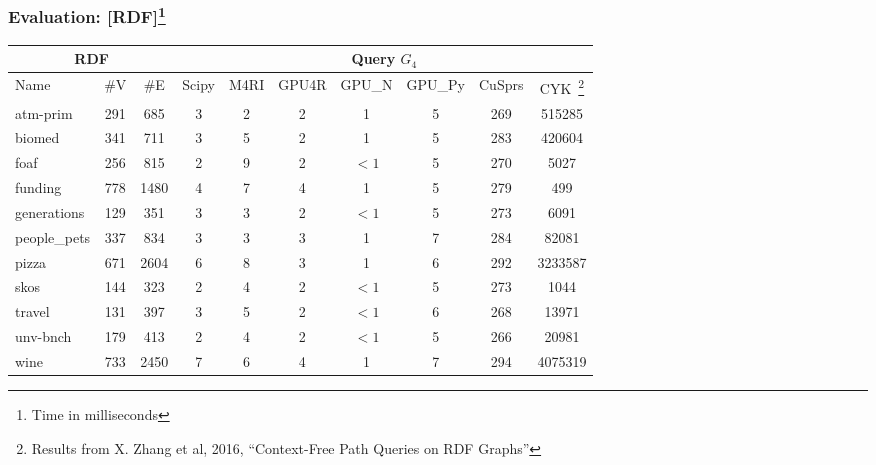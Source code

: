 \documentclass[xcolor=table]{beamer}
\newcommand{\ltz}{$< 1$}
\begin{document}
\begin{frame}[fragile] \frametitle{Evaluation: [RDF]\footnote{Time in milliseconds}}
\begin{center}
  {\tiny
  \begin{tabular}{| p{1.25cm} | c | c | c | c | c | c | c | c | c |}
      \hline
      \multicolumn{3}{|c|}{RDF}        & \multicolumn{7}{|c|}{Query $G_4$}  \\
      \hline
      Name                                & \#V & \#E  & Scipy & M4RI  & GPU4R & GPU\_N & GPU\_Py & CuSprs & CYK~\footnote{Results from X. Zhang et al, 2016, ``Context-Free Path Queries on RDF Graphs''} \\
      \hline
      \hline
      \tiny{atm-prim}                    & 291 & 685  & 3     &  2    & 2     & 1      & 5       & 269  & 515285  \\
      \tiny{biomed}                      & 341 & 711  & 3     &  5    & 2     & 1      & 5       & 283  & 420604  \\
      \tiny{foaf}                        & 256 & 815  & 2     &  9    & 2     & \ltz   & 5       & 270  & 5027    \\
      \tiny{funding}                     & 778 & 1480 & 4     &  7    & 4     & 1      & 5       & 279  & 499     \\
      \tiny{generations}                 & 129 & 351  & 3     &  3    & 2     & \ltz   & 5       & 273  & 6091    \\
      \tiny{people\_pets}                & 337 & 834  & 3     &  3    & 3     & 1      & 7       & 284  & 82081   \\
      \tiny{pizza}                       & 671 & 2604 & 6     &  8    & 3     & 1      & 6       & 292  & 3233587 \\
      \tiny{skos}                        & 144 & 323  & 2     &  4    & 2     & \ltz   & 5       & 273  & 1044    \\
      \tiny{travel}                      & 131 & 397  & 3     &  5    & 2     & \ltz   & 6       & 268  & 13971   \\
      \tiny{unv-bnch}                    & 179 & 413  & 2     &  4    & 2     & \ltz   & 5       & 266  & 20981   \\
      \tiny{wine}                        & 733 & 2450 & 7     &  6    & 4     & 1      & 7       & 294  & 4075319 \\
      \hline
    \end{tabular}
    }

\end{center}
\end{frame}
\end{document}
